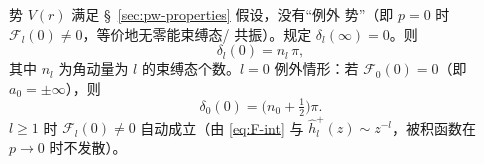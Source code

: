 \begin{theorem}[Levinson]\label{thm:pw-Levinson-full}
势 $V(r)$ 满足 \S~\ref{sec:pw-properties} 假设，没有“例外
势”（即 $p=0$ 时 $\mathcal F_l(0)\ne 0$，等价地无零能束缚态/
共振）。规定 $\delta_l(\infty)=0$。则
\begin{equation}\label{eq:pw-Levinson}
\delta_l(0)=n_l\,\pi,
\end{equation}
其中 $n_l$ 为角动量为 $l$ 的束缚态个数。$l=0$ 例外情形：若
$\mathcal F_0(0)=0$（即 $a_0=\pm\infty$），则
\begin{equation}\label{eq:pw-Levinson-exc}
\delta_0(0)=\bigl(n_0+\tfrac12\bigr)\pi.
\end{equation}
$l\ge 1$ 时 $\mathcal F_l(0)\ne 0$ 自动成立（由
\eqref{eq:F-int} 与 $\hat h_l^+(z)\sim z^{-l}$，被积函数在
$p\to 0$ 时不发散）。
\end{theorem}

